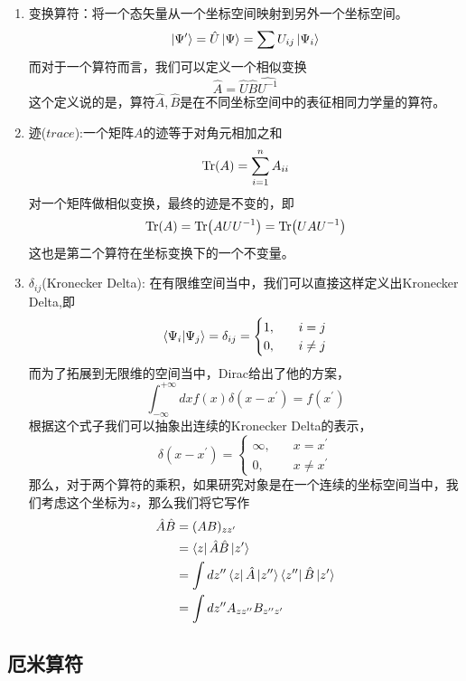 \documentclass{article}
\begin{document}
\begin{enumerate}
	\item 变换算符：将一个态矢量从一个坐标空间映射到另外一个坐标空间。
	      \[\ket{\Psi^\prime}=\hat{U}\ket{\Psi}=\sum U_{ij}\ket{\Psi_{i}}\]
	      而对于一个算符而言，我们可以定义一个相似变换
	      \[\hat{A}=\hat{U}\hat{B}\hat{U^{-1}}\]
	      这个定义说的是，算符$\hat{A},\hat{B}$是在不同坐标空间中的表征相同力学量的算符。
	\item 迹($trace$):一个矩阵$A$的迹等于对角元相加之和
	      \[\Tr(A)=\sum_{i=1}^{n} A_{ii}\]
	      对一个矩阵做相似变换，最终的迹是不变的，即
	      \[\Tr(A)=\Tr(AUU^{-1})=\Tr(UAU^{-1})\]
	      这也是第二个算符在坐标变换下的一个不变量。
	\item $\delta_{ij}$(Kronecker Delta):
	      在有限维空间当中，我们可以直接这样定义出Kronecker Delta,即
	      \[
		      \braket{\Psi_i}{\Psi_j}=\delta_{ij}=
		      \begin{cases}
			      1, & \quad i=j     \\
			      0, & \quad i\neq j
		      \end{cases}
	      \]
	      而为了拓展到无限维的空间当中，Dirac给出了他的方案，
	      \[\int_{-\infty}^{+\infty}dx f(x) \delta(x-x^\prime)=f(x^\prime)\]
	      根据这个式子我们可以抽象出连续的Kronecker Delta的表示，
	      \[
		      \delta(x-x^\prime)=
		      \begin{cases}
			      \infty, & \quad x=x^\prime     \\
			      0,      & \quad x\neq x^\prime
		      \end{cases}
	      \]
	      那么，对于两个算符的乘积，如果研究对象是在一个连续的坐标空间当中，我们考虑这个坐标为$z$，那么我们将它写作
	      \begin{align*}
		      \hat{A}\hat{B} & =(AB)_{zz^\prime}                                                                                      \\
		                     & =\bra{z}\hat{A}\hat{B}\ket{z^\prime}                                                                   \\
		                     & =\int dz^{\prime\prime}\bra{z}\hat{A}\ket{z^{\prime\prime}}\bra{z^{\prime\prime}}\hat{B}\ket{z^\prime} \\
		                     & =\int dz^{\prime\prime}A_{zz^{\prime\prime}}B_{z^{\prime\prime}z^\prime}
	      \end{align*}
\end{enumerate}


\subsection{厄米算符}
\end{document}
